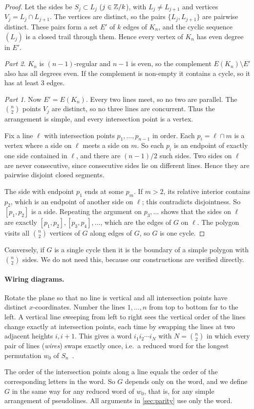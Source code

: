 \begin{proof}
Let the sides be $S_j\subset L_j$ ($j\in\mathbb Z/k$), with $L_j\ne L_{j+1}$ and vertices
$V_j=L_j\cap L_{j+1}$. The vertices are distinct, so the pairs $\{L_j,L_{j+1}\}$ are pairwise distinct.
These pairs form a set $E'$ of $k$ edges of $K_n$, and the cyclic sequence $(L_j)$ is a closed trail
through them. Hence every vertex of $K_n$ has even degree in $E'$.

\emph{Part 2.} $K_n$ is $(n-1)$-regular and $n-1$ is even, so the complement $E(K_n)\setminus E'$ also
has all degrees even. If the complement is non-empty it contains a cycle, so it has at least $3$
edges.

\emph{Part 1.} Now $E'=E(K_n)$. Every two lines meet, so no two are parallel. The $\binom n2$ points
$V_j$ are distinct, so no three lines are concurrent. Thus the arrangement is simple, and every
intersection point is a vertex.

Fix a line $\ell$ with intersection points $p_1,\dots,p_{n-1}$ in order. Each $p_i=\ell\cap m$ is a
vertex where a side on $\ell$ meets a side on $m$. So each $p_i$ is an endpoint of exactly one side
contained in $\ell$, and there are $(n-1)/2$ such sides. Two sides on $\ell$ are never consecutive,
since consecutive sides lie on different lines. Hence they are pairwise disjoint closed segments.

The side with endpoint $p_1$ ends at some $p_m$. If $m>2$, its relative interior contains $p_2$, which
is an endpoint of another side on $\ell$; this contradicts disjointness. So $[p_1,p_2]$ is a side.
Repeating the argument on $p_3,\dots$ shows that the sides on $\ell$ are exactly
$[p_1,p_2],[p_3,p_4],\dots$, which are the edges of $G$ on $\ell$. The polygon visits all $\binom n2$
vertices of $G$ along edges of $G$, so $G$ is one cycle.
\end{proof}

\begin{remark}
Conversely, if $G$ is a single cycle then it is the boundary of a simple polygon with $\binom n2$
sides. We do not need this, because our constructions are verified directly.
\end{remark}

\paragraph{Wiring diagrams.}
Rotate the plane so that no line is vertical and all intersection points have distinct
$x$-coordinates. Number the lines $1,\dots,n$ from top to bottom far to the left. A vertical line
sweeping from left to right sees the vertical order of the lines change exactly at intersection
points, each time by swapping the lines at two adjacent heights $i,i+1$. This gives a word
$i_1i_2\cdots i_N$ with $N=\binom n2$ in which every pair of lines (\emph{wires}) swaps exactly once,
i.e.\ a reduced word for the longest permutation $w_0$ of $S_n$~\cite{GoodmanPollack1984}.

The order of the intersection points along a line equals the order of the corresponding letters in
the word. So $G$ depends only on the word, and we define $G$ in the same way for any reduced word of
$w_0$, that is, for any simple arrangement of pseudolines. All arguments in \cref{sec:parity} use only
the word.
